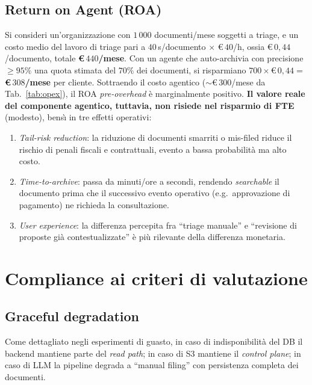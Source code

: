 \documentclass[11pt,a4paper,oneside]{article}
\begin{document}
\subsection{Return on Agent (ROA)}
Si consideri un'organizzazione con $1\,000$ documenti/mese soggetti a triage,
e un costo medio del lavoro di triage pari a $40$\,s/documento $\times$
\euro$\,40$/h, ossia \euro$\,0{,}44$/documento, totale
\textbf{\euro$\,440$/mese}. Con un agente che auto-archivia con precisione
$\geq 95\%$ una quota stimata del $70\%$ dei documenti, si risparmiano
$700 \times$\euro$\,0{,}44 = $\textbf{\euro$\,308$/mese} per cliente.
Sottraendo il costo agentico ($\sim$\euro$\,300$/mese da Tab.~\ref{tab:opex}),
il ROA \emph{pre-overhead} \`e marginalmente positivo.
\textbf{Il valore reale del componente agentico, tuttavia, non risiede nel
risparmio di FTE} (modesto), bens\`{\i} in tre effetti operativi:
\begin{enumerate}[leftmargin=*]
    \item \emph{Tail-risk reduction}: la riduzione di documenti smarriti o
          mis-filed riduce il rischio di penali fiscali e contrattuali, evento
          a bassa probabilit\`a ma alto costo.
    \item \emph{Time-to-archive}: passa da minuti/ore a secondi, rendendo
          \emph{searchable} il documento prima che il successivo evento
          operativo (e.g.\ approvazione di pagamento) ne richieda la consultazione.
    \item \emph{User experience}: la differenza percepita fra ``triage manuale''
          e ``revisione di proposte gi\`a contestualizzate'' \`e pi\`u rilevante
          della differenza monetaria.
\end{enumerate}

\section{Compliance ai criteri di valutazione}

\subsection{Graceful degradation}
Come dettagliato negli esperimenti di guasto, in caso di indisponibilit\`a del
DB il backend mantiene parte del \emph{read path}; in caso di S3 mantiene il
\emph{control plane}; in caso di LLM la pipeline degrada a ``manual filing''
con persistenza completa dei documenti.
\end{document}
